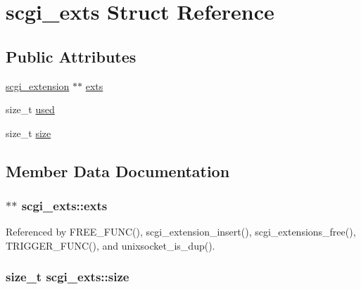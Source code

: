 \hypertarget{structscgi__exts}{\section{scgi\-\_\-exts Struct Reference}
\label{structscgi__exts}
}
\subsection*{Public Attributes}
\begin{DoxyCompactItemize}
\item 
\hyperlink{structscgi__extension}{scgi\-\_\-extension} $\ast$$\ast$ \hyperlink{structscgi__exts_a25d96b607cba50d0db4358d34525ecb8}{exts}
\item 
size\-\_\-t \hyperlink{structscgi__exts_a8ebe86ef35baec5e131f261933042cb9}{used}
\item 
size\-\_\-t \hyperlink{structscgi__exts_add77ea027038e7fe1fd4a5cb86f58d2d}{size}
\end{DoxyCompactItemize}


\subsection{Member Data Documentation}
\hypertarget{structscgi__exts_a25d96b607cba50d0db4358d34525ecb8}{
\subsubsection[{exts}]{$\ast$$\ast$ scgi\-\_\-exts\-::exts}}\label{structscgi__exts_a25d96b607cba50d0db4358d34525ecb8}


Referenced by F\-R\-E\-E\-\_\-\-F\-U\-N\-C(), scgi\-\_\-extension\-\_\-insert(), scgi\-\_\-extensions\-\_\-free(), T\-R\-I\-G\-G\-E\-R\-\_\-\-F\-U\-N\-C(), and unixsocket\-\_\-is\-\_\-dup().

\hypertarget{structscgi__exts_add77ea027038e7fe1fd4a5cb86f58d2d}{
\subsubsection[{size}]{\setlength{\rightskip}{0pt plus 5cm}size\-\_\-t scgi\-\_\-exts\-::size}}\label{structscgi__exts_add77ea027038e7fe1fd4a5cb86f58d2d}


